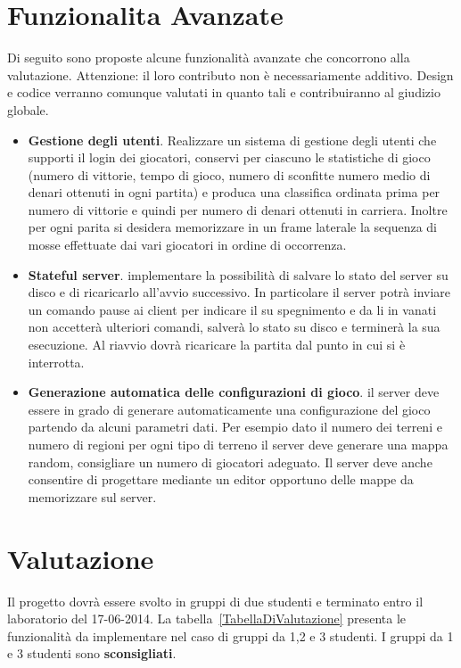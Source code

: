 \documentclass{article}
\begin{document}
\section{Funzionalita Avanzate}
\label{FunzionalitaAvanzate}
Di seguito sono proposte alcune funzionalit\`a avanzate che concorrono alla valutazione.  Attenzione: il loro contributo non \`e  necessariamente additivo. Design e codice verranno comunque valutati in quanto tali e contribuiranno al giudizio globale.

\begin{itemize}
\item \textbf{Gestione degli utenti}. Realizzare un sistema di gestione degli utenti che supporti il login dei giocatori, conservi per ciascuno le statistiche di gioco (numero di vittorie, tempo di gioco, numero di sconfitte numero medio di denari ottenuti in ogni partita) e produca una classifica ordinata prima per numero di vittorie e quindi per numero di denari ottenuti in carriera. Inoltre per ogni parita si desidera memorizzare in un frame laterale la sequenza di mosse effettuate dai vari giocatori in ordine di occorrenza.
\item  \textbf{Stateful server}. implementare la possibilit\`a di salvare lo stato del server su disco e di ricaricarlo all'avvio successivo. In particolare il server potr\`a inviare un comando pause ai client per indicare il su spegnimento e da li in vanati non accetter\`a ulteriori comandi, salver\`a lo stato su disco e terminer\`a la sua esecuzione. Al riavvio dovr\`a ricaricare la partita dal punto in cui si \`e interrotta. 
\item \textbf{Generazione automatica delle configurazioni di gioco}. il server deve essere in grado di generare automaticamente una configurazione del gioco partendo da alcuni parametri dati. Per esempio dato il numero  dei terreni e numero di regioni per  ogni tipo di terreno il server deve generare una mappa random, consigliare un numero di giocatori adeguato. Il server deve anche consentire di progettare mediante un editor opportuno delle mappe da memorizzare sul server.
\end{itemize}


\section{Valutazione}
Il progetto dovr\`a essere svolto in gruppi di due studenti e terminato entro il laboratorio del 17-06-2014. La tabella~\ref{TabellaDiValutazione} presenta le funzionalit\`a da implementare nel caso di gruppi da 1,2 e 3 studenti. I gruppi da 1 e 3 studenti sono \textbf{sconsigliati}.
\end{document}
